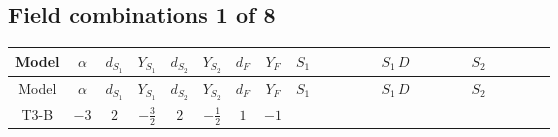 \documentclass[8pt]{article}
\begin{document}
\begin{landscape}
\subsection*{Field combinations 1 of 8}
\begin{longtable}{@{}cccccccc >{\raggedright\arraybackslash}p{0.21\linewidth} >{\raggedright\arraybackslash}p{0.21\linewidth} >{\raggedright\arraybackslash}p{0.21\linewidth}@{}}
\toprule
Model & $\alpha$ & $d_{S_1}$ & $Y_{S_1}$ & $d_{S_2}$ & $Y_{S_2}$ & $d_F$ & $Y_F$ & $S_1$ & $S_1\,D$ & $S_2$ \\
\midrule
\endfirsthead
\toprule
Model & $\alpha$ & $d_{S_1}$ & $Y_{S_1}$ & $d_{S_2}$ & $Y_{S_2}$ & $d_F$ & $Y_F$ & $S_1$ & $S_1\,D$ & $S_2$ \\
\midrule
\endhead
T3-B & $-3$ & $2$ & $-\frac{3}{2}$ & $2$ & $-\frac{1}{2}$ & $1$ & $-1$ & \scriptsize\adjustbox{max width=\linewidth}{$\begin{gathered} -C_{S_1^\dagger S_1} S_{1,j_1} S_{1,j_1}{}^{\dagger } \\ +\frac{1}{2} C_{S_1^\dagger S_1} \hbar  \overline{y_{1,i_1,r_1}} S_{1,j_1} y_{1,i_1,r_1} S_{1,j_1}{}^{\dagger } \\ +\frac{C_{S_1^\dagger S_1} \hbar  \overline{y_{1,i_1,r_1}} S_{1,j_1} y_{1,i_1,r_1} S_{1,j_1}{}^{\dagger }}{\epsilon }\end{gathered}$} & \scriptsize\adjustbox{max width=\linewidth}{$\begin{gathered} +D_{\mu _1}\left(S_{1,j_1}\right){}^{\dagger } D_{\mu _1}\left(S_{1,j_1}\right)\end{gathered}$} & \scriptsize\adjustbox{max width=\linewidth}{$\begin{gathered} -C_{S_2^\dagger S_2} S_{2,j_1} S_{2,j_1}{}^{\dagger } \\ +\frac{1}{2} C_{S_2^\dagger S_2} \hbar  \overline{y_{2,i_1,r_1}} S_{2,j_1} y_{2,i_1,r_1} S_{2,j_1}{}^{\dagger } \\ +\frac{C_{S_2^\dagger S_2} \hbar  \overline{y_{2,i_1,r_1}} S_{2,j_1} y_{2,i_1,r_1} S_{2,j_1}{}^{\dagger }}{\epsilon }\end{gathered}$} \\

\end{longtable}
\end{landscape}
\end{document}
